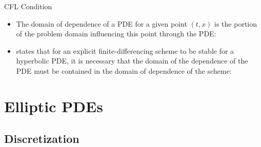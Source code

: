 \begin{frame}{CFL Condition}

\begin{itemize}
\item The domain of dependence of a PDE for a given point $(t,x)$ is the portion of the problem domain influencing this point through the PDE:


\item {} states that for an explicit finite-differencing scheme to be stable for a hyperbolic PDE, it is necessary that the domain of the dependence of the PDE must be contained in the domain of dependence of the scheme:


\end{itemize}
\end{frame}

\section{Elliptic PDEs}

\subsection{Discretization}

